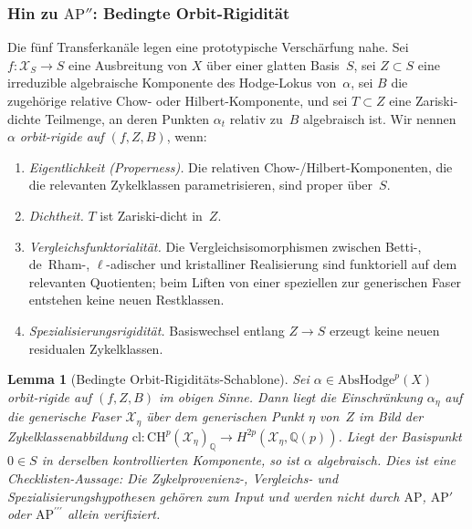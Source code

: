 \documentclass[aps,prd,twocolumn,superscriptaddress,nofootinbib]{revtex4-2}
\newtheorem{lemma}[theorem]{Lemma}
\theoremstyle{definition}
\theoremstyle{remark}
\begin{document}
\subsubsection*{Hin zu \texorpdfstring{$\mathrm{AP}''$}{AP''}: Bedingte Orbit-Rigidität}
\label{subsec:orbit-rigidity}

Die fünf Transferkanäle legen eine prototypische Verschärfung nahe.  Sei
$f\colon \mathcal{X}_{S}\to S$ eine Ausbreitung von $X$ über einer glatten
Basis~$S$, sei $Z\subset S$ eine irreduzible algebraische Komponente des
Hodge-Lokus von~$\alpha$, sei $B$ die zugehörige relative Chow- oder
Hilbert-Komponente, und sei $T\subset Z$ eine Zariski-dichte Teilmenge,
an deren Punkten $\alpha_{t}$ relativ zu~$B$ algebraisch ist.
Wir nennen $\alpha$ \emph{orbit-rigide auf $(f,Z,B)$}, wenn:
\begin{enumerate}
\item[(i)] \emph{Eigentlichkeit (Properness).} Die relativen Chow-/Hilbert-Komponenten,
  die die relevanten Zykelklassen parametrisieren, sind proper über~$S$.
\item[(ii)] \emph{Dichtheit.} $T$ ist Zariski-dicht in~$Z$.
\item[(iii)] \emph{Vergleichsfunktorialität.}  Die Vergleichsisomorphismen
  zwischen Betti-, de~Rham-, $\ell$-adischer und kristalliner
  Realisierung sind funktoriell auf dem relevanten Quotienten; beim Liften
  von einer speziellen zur generischen Faser entstehen keine neuen
  Restklassen.
\item[(iv)] \emph{Spezialisierungsrigidität.}  Basiswechsel entlang
  $Z\to S$ erzeugt keine neuen residualen Zykelklassen.
\end{enumerate}

\begin{lemma}[Bedingte Orbit-Rigiditäts-Schablone]
\label{lem:orbit-rigidity}
Sei $\alpha\in\mathrm{AbsHodge}^{p}(X)$ orbit-rigide auf $(f,Z,B)$
im obigen Sinne.  Dann liegt die Einschränkung $\alpha_{\eta}$ auf die
generische Faser $\mathcal{X}_{\eta}$ über dem generischen Punkt $\eta$
von~$Z$ im Bild der Zykelklassenabbildung
$\mathrm{cl}\colon\mathrm{CH}^{p}(\mathcal{X}_{\eta})_{\mathbb{Q}}\to
H^{2p}(\mathcal{X}_{\eta},\mathbb{Q}(p))$.
Liegt der Basispunkt $0\in S$ in derselben kontrollierten Komponente,
so ist $\alpha$ algebraisch.
Dies ist eine Checklisten-Aussage: Die Zykelprovenienz-, Vergleichs- und
Spezialisierungshypothesen gehören zum Input und werden nicht durch
$\mathrm{AP}$, $\mathrm{AP}'$ oder $\mathrm{AP}^{\prime\prime\prime}$ allein
verifiziert.
\end{lemma}
\end{document}
